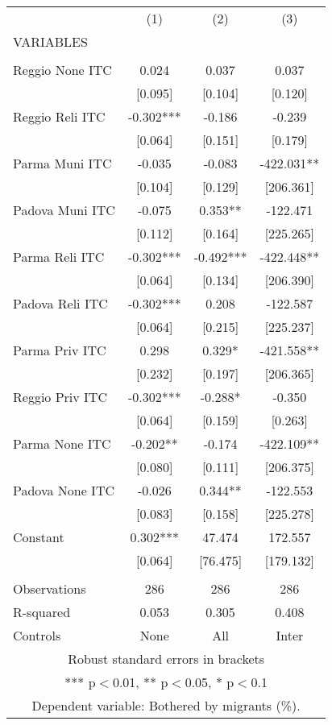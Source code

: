 \begin{tabular}{lccc} \hline
 & (1) & (2) & (3) \\
VARIABLES &  &  &  \\ \hline
 &  &  &  \\
Reggio None ITC & 0.024 & 0.037 & 0.037 \\
 & [0.095] & [0.104] & [0.120] \\
Reggio Reli ITC & -0.302*** & -0.186 & -0.239 \\
 & [0.064] & [0.151] & [0.179] \\
Parma Muni ITC & -0.035 & -0.083 & -422.031** \\
 & [0.104] & [0.129] & [206.361] \\
Padova Muni ITC & -0.075 & 0.353** & -122.471 \\
 & [0.112] & [0.164] & [225.265] \\
Parma Reli ITC & -0.302*** & -0.492*** & -422.448** \\
 & [0.064] & [0.134] & [206.390] \\
Padova Reli ITC & -0.302*** & 0.208 & -122.587 \\
 & [0.064] & [0.215] & [225.237] \\
Parma Priv ITC & 0.298 & 0.329* & -421.558** \\
 & [0.232] & [0.197] & [206.365] \\
Reggio Priv ITC & -0.302*** & -0.288* & -0.350 \\
 & [0.064] & [0.159] & [0.263] \\
Parma None ITC & -0.202** & -0.174 & -422.109** \\
 & [0.080] & [0.111] & [206.375] \\
Padova None ITC & -0.026 & 0.344** & -122.553 \\
 & [0.083] & [0.158] & [225.278] \\
Constant & 0.302*** & 47.474 & 172.557 \\
 & [0.064] & [76.475] & [179.132] \\
 &  &  &  \\
Observations & 286 & 286 & 286 \\
R-squared & 0.053 & 0.305 & 0.408 \\
 Controls & None & All & Inter \\ \hline
\multicolumn{4}{c}{ Robust standard errors in brackets} \\
\multicolumn{4}{c}{ *** p$<$0.01, ** p$<$0.05, * p$<$0.1} \\
\multicolumn{4}{c}{ Dependent variable: Bothered by migrants (\%).} \\
\end{tabular}
